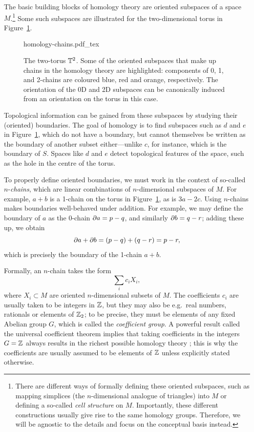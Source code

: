 The basic building blocks of homology theory are oriented subspaces of a space $M$.\footnote{
	There are different ways of formally defining these oriented subspaces, such as mapping simplices (the $n$-dimensional analogue of triangles) into $M$ or defining a so-called \emph{cell structure} on $M$. Importantly, these different constructions usually give rise to the same homology groups. Therefore, we will be agnostic to the details and focus on the conceptual basis instead.}
Some such subspaces are illustrated for the two-dimensional torus in Figure~\ref{fig:homology-chains}.
\begin{figure}[htb!]
	\centering
	\def\svgwidth{.6\linewidth}
	{homology-chains.pdf_tex}
	\caption{The two-torus $\mathbb{T}^2$. Some of the oriented subspaces that make up chains in the homology theory are highlighted: components of 0, 1, and 2-chains are coloured blue, red and orange, respectively. The orientation of the 0D and 2D subspaces can be canonically induced from an orientation on the torus in this case.}
	\label{fig:homology-chains}
\end{figure}
Topological information can be gained from these subspaces by studying their (oriented) boundaries. The goal of homology is to find subspaces such as $d$ and $e$ in Figure~\ref{fig:homology-chains}, which do not have a boundary, but cannot themselves be written as the boundary of another subset either---unlike $c$, for instance, which is the boundary of $S$. Spaces like $d$ and $e$ detect topological features of the space, such as the hole in the centre of the torus.

To properly define oriented boundaries, we must work in the context of so-called $n$-\emph{chains}, which are linear combinations of $n$-dimensional subspaces of $M$. For example, $a+b$ is a 1-chain on the torus in Figure~\ref{fig:homology-chains}, as is $3a-2c$. Using $n$-chains makes boundaries well-behaved under addition. For example, we may define the boundary of $a$ as the 0-chain $\partial a = p - q$, and similarly $\partial b = q - r$; adding these up, we obtain
\begin{equation*}
	\partial a + \partial b = (p - q) + (q - r) = p - r,
\end{equation*}
which is precisely the boundary of the 1-chain $a+b$.

Formally, an $n$-chain takes the form
\begin{equation*}
	\sum_i c_i X_i,
\end{equation*}
where $X_i\subset M$ are oriented $n$-dimensional subsets of $M$. The coefficients $c_i$ are usually taken to be integers in $\mathbb{Z}$, but they may also be e.g.\ real numbers, rationals or elements of $\mathbb{Z}_2$; to be precise, they must be elements of any fixed Abelian group $G$, which is called the \emph{coefficient group}. A powerful result called the universal coefficient theorem implies that taking coefficients in the integers $G=\mathbb{Z}$ always results in the richest possible homology theory \parencite[\S3.A]{Hatcher_algebraic-topology}; this is why the coefficients are usually assumed to be elements of $\mathbb{Z}$ unless explicitly stated otherwise.

